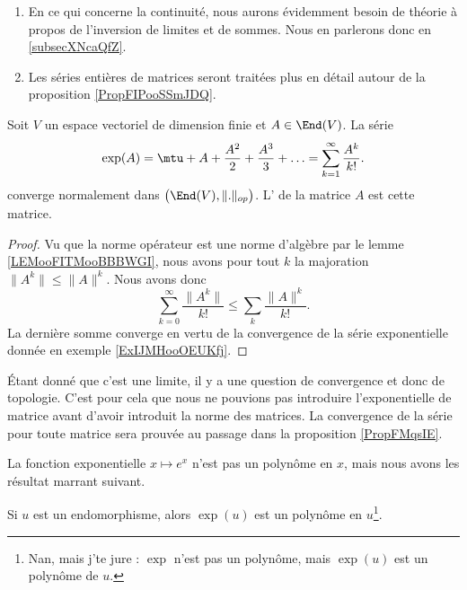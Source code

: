 \begin{enumerate}
    \item
        En ce qui concerne la continuité, nous aurons évidemment besoin de théorie à propos de l'inversion de limites et de sommes. Nous en parlerons donc en \ref{subsecXNcaQfZ}.
    \item 
        Les séries entières de matrices seront traitées plus en détail autour de la proposition \ref{PropFIPooSSmJDQ}.
\end{enumerate}

\begin{proposition}     \label{PropPEDSooAvSXmY}
    Soit \( V\) un espace vectoriel de dimension finie et \( A\in\End(V)\). La série
    \begin{equation}
        \exp(A)=\mtu+A+\frac{ A^2 }{ 2 }+\frac{ A^3 }{ 3 }+\ldots =\sum_{k=1}^{\infty}\frac{ A^k }{ k! }.
    \end{equation}
    converge normalement dans \( \big( \End(V),\| . \|_{op} \big)\).  L' de la matrice \( A\) est cette matrice.
\end{proposition}

\begin{proof}
    Vu que la norme opérateur est une norme d'algèbre par le lemme \ref{LEMooFITMooBBBWGI}, nous avons pour tout \( k\) la majoration \( \| A^k \|\leq \| A \|^k\). Nous avons donc
    \begin{equation}
        \sum_{k=0}^{\infty}\frac{ \| A^k \| }{ k! }\leq \sum_k\frac{ \| A \|^k }{ k! }.
    \end{equation}
    La dernière somme converge en vertu de la convergence de la série exponentielle donnée en exemple \ref{ExIJMHooOEUKfj}.
\end{proof}

Étant donné que c'est une limite, il y a une question de convergence et donc de topologie. C'est pour cela que nous ne pouvions pas introduire l'exponentielle de matrice avant d'avoir introduit la norme des matrices. La convergence de la série pour toute matrice sera prouvée au passage dans la proposition \ref{PropFMqsIE}.


La fonction exponentielle \(  x\mapsto e^{x}\) n'est pas un polynôme en \( x\), mais nous avons les résultat marrant suivant.
\begin{proposition} \label{PropFMqsIE}
    Si \( u\) est un endomorphisme, alors \( \exp(u)\) est un polynôme en \( u\)\footnote{Nan, mais j'te jure : \( \exp\) n'est pas un polynôme, mais $\exp(u)$ est un polynôme de \( u\).}.
\end{proposition}

